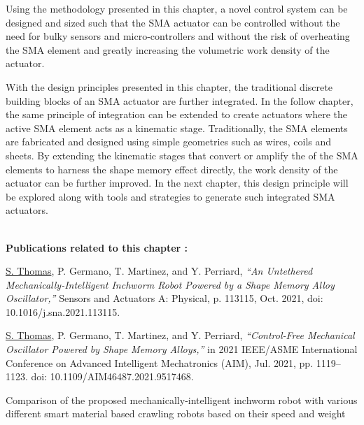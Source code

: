 Using the methodology presented in this chapter, a novel control system can be designed and sized such that the SMA actuator can be controlled without the need for bulky sensors and micro-controllers and without the risk of overheating the SMA element and greatly increasing the volumetric work density of the actuator.

With the design principles presented in this chapter, the traditional discrete building blocks of an SMA actuator are further integrated. In the follow chapter, the same principle of integration can be extended to create actuators where the active SMA element acts as a kinematic stage. Traditionally, the SMA elements are fabricated and designed using simple geometries such as wires, coils and sheets. By extending the kinematic stages that convert or amplify the of the SMA elements to harness the shape memory effect directly, the work density of the actuator can be further improved. In the next chapter, this design principle will be explored along with tools and strategies to generate such integrated SMA actuators.

\vspace*{\fill}
\noindent\hrulefill \\
\textbf{\large Publications related to this chapter :}

\underline{S. Thomas}, P. Germano, T. Martinez, and Y. Perriard, \textit{“An Untethered Mechanically-Intelligent Inchworm Robot Powered by a Shape Memory Alloy Oscillator,”} Sensors and Actuators A: Physical, p. 113115, Oct. 2021, doi: 10.1016/j.sna.2021.113115.

\underline{S. Thomas}, P. Germano, T. Martinez, and Y. Perriard, \textit{“Control-Free Mechanical Oscillator Powered by Shape Memory Alloys,”} in 2021 IEEE/ASME International Conference on Advanced Intelligent Mechatronics (AIM), Jul. 2021, pp. 1119–1123. doi: 10.1109/AIM46487.2021.9517468.

\begin{table}[htp!]
 \centering
 \hfill
 \caption{Comparison of the proposed mechanically-intelligent inchworm robot with various different smart material based crawling robots based on their speed and weight}
 \label{tab:literature-compare}
 
\end{table}
